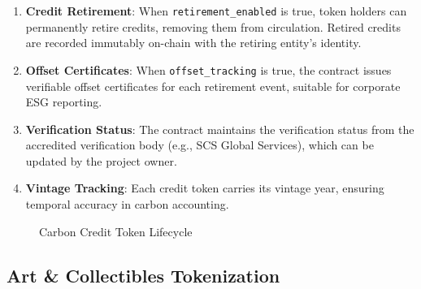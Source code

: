 \documentclass[11pt,a4paper,twoside]{article}
\begin{document}
\begin{enumerate}
  \item \textbf{Credit Retirement}: When \texttt{retirement\_enabled} is true, token holders can permanently retire credits, removing them from circulation. Retired credits are recorded immutably on-chain with the retiring entity's identity.

  \item \textbf{Offset Certificates}: When \texttt{offset\_tracking} is true, the contract issues verifiable offset certificates for each retirement event, suitable for corporate ESG reporting.

  \item \textbf{Verification Status}: The contract maintains the verification status from the accredited verification body (e.g., SCS Global Services), which can be updated by the project owner.

  \item \textbf{Vintage Tracking}: Each credit token carries its vintage year, ensuring temporal accuracy in carbon accounting.
\end{enumerate}

\begin{figure}[H]
\centering
{}
\caption{Carbon Credit Token Lifecycle}
\label{fig:carbon-lifecycle}
\end{figure}

\subsection{Art \& Collectibles Tokenization}
\label{subsec:art}
\end{document}
